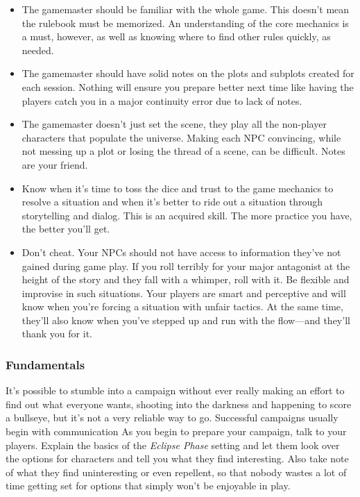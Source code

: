 \begin{itemize} \item The gamemaster should be familiar with the whole game. This doesn't mean the rulebook must be memorized. An understanding of the core mechanics is a must, however, as well as knowing where to find other rules quickly, as needed. \item The gamemaster should have solid notes on the plots and subplots created for each session. Nothing will ensure you prepare better next time like having the players catch you in a major continuity error due to lack of notes. \item The gamemaster doesn't just set the scene, they play all the non-player characters that populate the universe. Making each NPC convincing, while not messing up a plot or losing the thread of a scene, can be difficult. Notes are your friend. \item Know when it's time to toss the dice and trust to the game mechanics to resolve a situation and when it's better to ride out a situation through storytelling and dialog. This is an acquired skill. The more practice you have, the better you'll get. \item Don't cheat. Your NPCs should not have access to information they've not gained during game play. If you roll terribly for your major antagonist at the height of the story and they fall with a whimper, roll with it. Be flexible and improvise in such situations. Your players are smart and perceptive and will know when you're forcing a situation with unfair tactics. At the same time, they'll also know when you've stepped up and run with the flow—and they'll thank you for it. \end{itemize} 

\subsubsection{Fundamentals} 

It's possible to stumble into a campaign without ever really making an effort to find out what everyone wants, shooting into the darkness and happening to score a bullseye, but it's not a very reliable way to go. Successful campaigns usually begin with communication As you begin to prepare your campaign, talk to your players. Explain the basics of the \textit{Eclipse Phase} setting and let them look over the options for characters and tell you what they find interesting. Also take note of what they find uninteresting or even repellent, so that nobody wastes a lot of time getting set for options that simply won't be enjoyable in play. 

